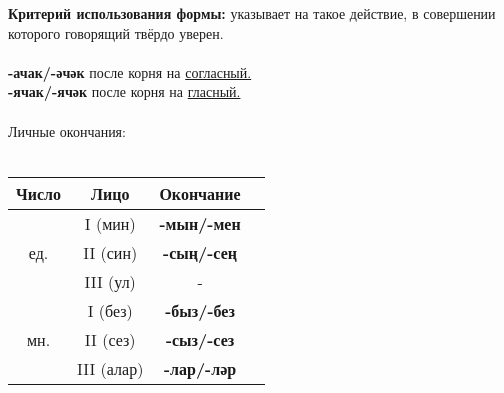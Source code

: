 \textbf{Критерий использования формы:} указывает на такое действие, в совершении которого говорящий твёрдо уверен.\\\\
\textbf{-ачак/-әчәк} после корня на \underline{согласный.}\\
\textbf{-ячак/-ячәк} после корня на \underline{гласный.}\\\\
Личные окончания:\\\\
\begin{tabular}{ |c|c|c|c| } 
\hline
Число & Лицо & Окончание \\
\hline
\multirow{3}{4em}{ед.}
& I (мин) & \textbf{-мын/-мен} \\  
& II (син) & \textbf{-сың/-сең} \\ 
& III (ул) & - \\ 
\hline
\multirow{3}{4em}{мн.}
& I (без) & \textbf{-быз/-без} \\  
& II (сез) & \textbf{-сыз/-сез} \\ 
& III (алар) & \textbf{-лар/-ләр} \\ 
\hline
\end{tabular} \\\\\\